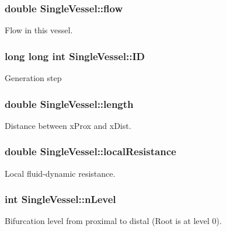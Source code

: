 \subsubsection[{\texorpdfstring{flow}{flow}}]{\setlength{\rightskip}{0pt plus 5cm}double Single\+Vessel\+::flow}\hypertarget{class_single_vessel_a31a369f55958ce8d945fab6781e577c4}{}\label{class_single_vessel_a31a369f55958ce8d945fab6781e577c4}
Flow in this vessel. 
\subsubsection[{\texorpdfstring{ID}{ID}}]{\setlength{\rightskip}{0pt plus 5cm}long long int Single\+Vessel\+::\+ID}\hypertarget{class_single_vessel_ab59549ae5a43283077be9bbb25cc01a6}{}\label{class_single_vessel_ab59549ae5a43283077be9bbb25cc01a6}
Generation step 
\subsubsection[{\texorpdfstring{length}{length}}]{\setlength{\rightskip}{0pt plus 5cm}double Single\+Vessel\+::length}\hypertarget{class_single_vessel_af96ace62c72b4c495e625724fdc69c1f}{}\label{class_single_vessel_af96ace62c72b4c495e625724fdc69c1f}
Distance between x\+Prox and x\+Dist. 
\subsubsection[{\texorpdfstring{local\+Resistance}{localResistance}}]{\setlength{\rightskip}{0pt plus 5cm}double Single\+Vessel\+::local\+Resistance}\hypertarget{class_single_vessel_a8f5954708c5334dc8ed9f10693381566}{}\label{class_single_vessel_a8f5954708c5334dc8ed9f10693381566}
Local fluid-\/dynamic resistance. 
\subsubsection[{\texorpdfstring{n\+Level}{nLevel}}]{\setlength{\rightskip}{0pt plus 5cm}int Single\+Vessel\+::n\+Level}\hypertarget{class_single_vessel_acb4f005fc124382aa5dac06194b43007}{}\label{class_single_vessel_acb4f005fc124382aa5dac06194b43007}
Bifurcation level from proximal to distal (Root is at level 0). 

